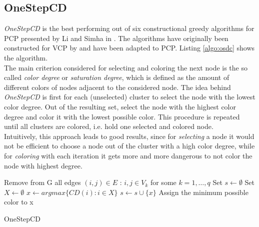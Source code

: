 \subsection{OneStepCD}
\textit{OneStepCD} is the best performing out of six constructional greedy algorithms for PCP presented by Li and Simha in \cite{li-00}. The algorithms have originally been constructed for VCP by \cite{brelaz-79} and have been adapted to PCP. Listing \ref{algo:osdc} shows the algorithm.\\
The main criterion considered for selecting and coloring the next node is the so called \textit{color degree} or \textit{saturation degree}, which is defined as the amount of different colors of nodes adjacent to the considered node. The idea behind \textit{OneStepCD} is first for each (unselected) cluster to select the node with the lowest color degree. Out of the resulting set, select the node with the highest color degree and color it with the lowest possible color. This procedure is repeated until all clusters are colored, i.e. hold one selected and colored node.\\
Intuitively, this approach leads to good results, since for \textit{selecting} a node it would not be efficient to choose a node out of the cluster with a high color degree, while for \textit{coloring} with each iteration it gets more and more dangerous to not color the node with highest degree.

\begin{algorithm}[h]
Remove from G all edges $(i,j) \in E$ : $i,j \in V_k$ for some $k=1,\ldots,q$\; 
Set $s \gets \emptyset $\;
 {
  Set $X \gets \emptyset $\;
  $x \gets argmax\{CD(i) : i \in X \}$\;
  $s \gets s \cup \{x\}$\;
  Assign the minimum possible color to x\;
}
\;
\caption{OneStepCD}
\label{algo:osdc}
\end{algorithm}

